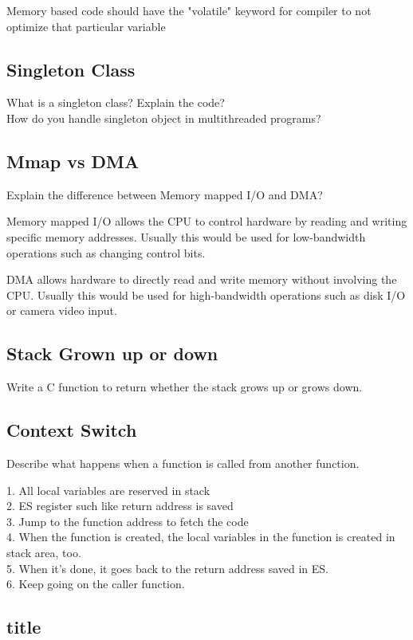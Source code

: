 Memory based code should have the "volatile" keyword for compiler to not optimize that particular variable

\subsection{Singleton Class}
What is a singleton class? Explain the code? \\
How do you handle singleton object in multithreaded programs?

\subsection{Mmap vs DMA}
Explain the difference between Memory mapped I/O and DMA?

Memory mapped I/O allows the CPU to control hardware by reading and writing specific memory addresses. Usually this would be used for low-bandwidth operations such as changing 
control bits. 

DMA allows hardware to directly read and write memory without involving the CPU. Usually this would be used for high-bandwidth operations such as disk I/O or camera video input. 

\subsection{Stack Grown up or down}
Write a C function to return whether the stack grows up or grows down.

\subsection{Context Switch}
Describe what happens when a function is called from another function.

1. All local variables are reserved in stack \\
2. ES register such like return address is saved \\
3. Jump to the function address to fetch the code \\
4. When the function is created, the local variables in the function is created in stack area, too. \\
5. When it's done, it goes back to the return address saved in ES. \\
6. Keep going on the caller function.

\subsection{title}

